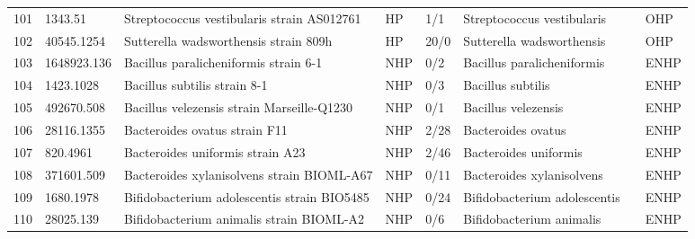 \begin{longtable}{llllllll}
101 &       1343.51 &                               Streptococcus vestibularis strain AS012761 &    HP &       1/1 &                     Streptococcus vestibularis &                      \cite{tufan2010spondylodiscitis,1343.51} &   OHP \\
102 &    40545.1254 &                                    Sutterella wadsworthensis strain 809h &    HP &      20/0 &                      Sutterella wadsworthensis &                           \cite{wang2013increased,40545.1254} &   OHP \\
103 &   1648923.136 &                                    Bacillus paralicheniformis strain 6-1 &   NHP &       0/2 &                     Bacillus paralicheniformis &                           \cite{zhao2020adhesion,1648923.136} &  ENHP \\
104 &     1423.1028 &                                             Bacillus subtilis strain 8-1 &   NHP &       0/3 &                              Bacillus subtilis &                      \cite{elshaghabee2017bacillus,1423.1028} &  ENHP \\
105 &    492670.508 &                               Bacillus velezensis strain Marseille-Q1230 &   NHP &       0/1 &                            Bacillus velezensis &                             \cite{492670.508,reva2019genetic} &  ENHP \\
106 &    28116.1355 &                                            Bacteroides ovatus strain F11 &   NHP &      2/28 &                             Bacteroides ovatus &                                \cite{28116.1355,tan2018pilot} &  ENHP \\
107 &      820.4961 &                                         Bacteroides uniformis strain A23 &   NHP &      2/46 &                          Bacteroides uniformis &                         \cite{820.4961,benitez2017glycolytic} &  ENHP \\
108 &    371601.509 &                               Bacteroides xylanisolvens strain BIOML-A67 &   NHP &      0/11 &                      Bacteroides xylanisolvens &                \cite{poyet2019library,ulsemer2012preliminary} &  ENHP \\
109 &     1680.1978 &                              Bifidobacterium adolescentis strain BIO5485 &   NHP &      0/24 &                   Bifidobacterium adolescentis &                                       \cite{pompei2007folate} &  ENHP \\
110 &     28025.139 &                                 Bifidobacterium animalis strain BIOML-A2 &   NHP &       0/6 &                       Bifidobacterium animalis &                   \cite{poyet2019library,lugli2019dissecting} &  ENHP \\

\end{longtable}
